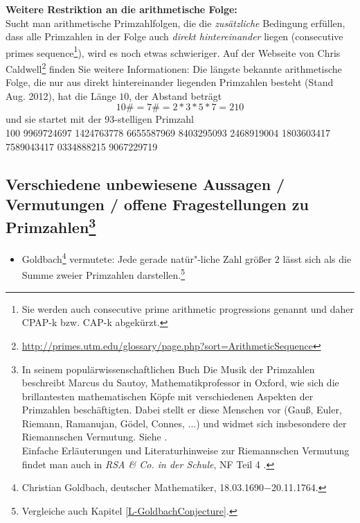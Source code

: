 \begin{refsegment}
\begin{itemize}
     \textbf{Weitere Restriktion an die arithmetische Folge:}\\
     Sucht man arithmetische Primzahlfolgen,
     die die {\em zusätzliche} Bedingung erfüllen, dass alle Primzahlen
     in der Folge auch {\em direkt hintereinander} liegen (consecutive
     primes sequence\footnote{%
     Sie werden auch consecutive prime arithmetic progressions genannt
     und daher CPAP-k bzw. CAP-k abgekürzt.
     }), wird es noch etwas schwieriger. Auf der
     Webseite von Chris Caldwell\footnote{%
     \url{http://primes.utm.edu/glossary/page.php?sort=ArithmeticSequence}
     }
     finden Sie weitere Informationen: Die längste bekannte arithmetische
     Folge, die nur aus direkt hintereinander liegenden Primzahlen besteht
     (Stand Aug. 2012), hat die Länge $10$, der Abstand beträgt
     $$ 10\# = 7\# = 2 * 3 * 5 * 7 = 210 $$
     und sie startet mit der 93-stelligen Primzahl\\
     100 9969724697 1424763778 6655587969 8403295093 2468919004 1803603417 7589043417 0334888215 9067229719\\


\end{itemize}



\subsection[Verschiedene unbewiesene Aussagen / Vermutungen / offene Fragestellungen zu Primzahlen]
           {Verschiedene unbewiesene Aussagen / Vermutungen / offene Fragestellungen zu Primzahlen\footnote{%
  In seinem populärwissenschaftlichen Buch \glqq Die Musik der Primzahlen\grqq~
  beschreibt Marcus du Sautoy, Mathematikprofessor in Oxford, wie sich die
  brillantesten mathematischen Köpfe mit verschiedenen Aspekten der Primzahlen
  beschäftigten. Dabei stellt er diese Menschen vor (Gauß, Euler, Riemann, Ramanujan,
  Gödel, Connes, ...) und widmet sich insbesondere der \glqq Riemannschen Vermutung\grqq.
  Siehe \cite{duSautoy2005}.\\
  Einfache Erläuterungen und Literaturhinweise zur Riemannschen Vermutung findet man
  auch in {\em RSA \& Co. in der Schule}, NF Teil 4 \cite{Witten2010a}.
}
}

\begin{itemize}
  \item Goldbach\footnote{%
     Christian Goldbach, deutscher Mathematiker,
     18.03.1690$-$20.11.1764. }
     vermutete:
     Jede gerade natür"-liche Zahl größer $2$ lässt sich als die Summe
     zweier Primzahlen darstellen.\footnote{Vergleiche auch Kapitel
     \ref{L-GoldbachConjecture}.}



\end{itemize}
\end{refsegment}
